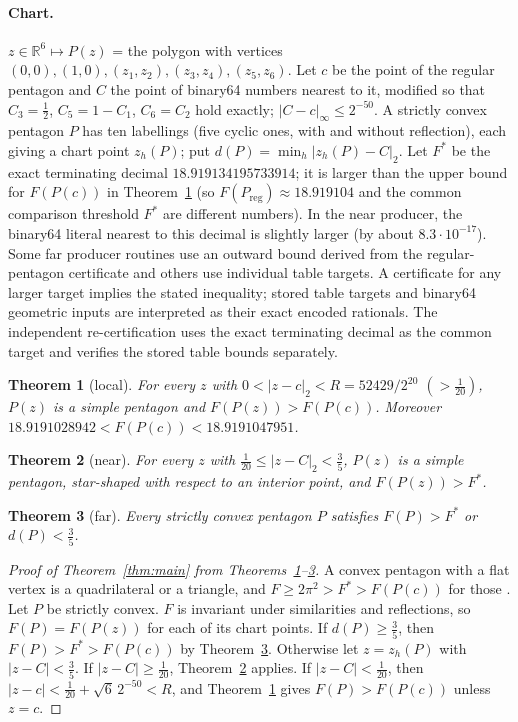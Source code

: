 \documentclass[11pt]{article}
\newtheorem{theorem}{Theorem}
\theoremstyle{remark}
\newcommand{\R}{\mathbb{R}}
\begin{document}
\paragraph{Chart.} $z\in\R^6\mapsto P(z)$ = the polygon with vertices $(0,0),(1,0),(z_1,z_2),(z_3,z_4),(z_5,z_6)$.
Let $c$ be the point of the regular pentagon and $C$ the point of binary64 numbers nearest to it, modified so that
$C_3=\frac12$, $C_5=1-C_1$, $C_6=C_2$ hold exactly; $|C-c|_\infty\le2^{-50}$. A strictly convex pentagon $P$ has ten
labellings (five cyclic ones, with and without reflection), each giving a chart point $z_h(P)$; put
$d(P)=\min_h|z_h(P)-C|_2$. Let $F^*$ be the exact terminating decimal $18.919134195733914$; it is larger than the upper
bound for $F(P(c))$ in Theorem~\ref{thm:L} (so $F(P_{\mathrm{reg}})\approx18.919104$ and the common comparison
threshold $F^*$ are different numbers). In the near producer, the binary64 literal nearest to this decimal is slightly
larger (by about $8.3\cdot10^{-17}$). Some far producer routines use an outward bound derived from the regular-pentagon
certificate and others use individual table targets. A certificate for any larger target implies the stated
inequality; stored table targets and binary64 geometric inputs are interpreted as their exact encoded rationals. The
independent re-certification uses the exact terminating decimal as the common target and verifies the stored table
bounds separately.

\begin{theorem}[local]\label{thm:L}
For every $z$ with $0<|z-c|_2<R=52429/2^{20}$ $(>\frac1{20})$, $P(z)$ is a simple pentagon and $F(P(z))>F(P(c))$. Moreover
$18.9191028942<F(P(c))<18.9191047951$.
\end{theorem}
\begin{theorem}[near]\label{thm:N}
For every $z$ with $\frac1{20}\le|z-C|_2<\frac35$, $P(z)$ is a simple pentagon, star-shaped with respect to an
interior point, and $F(P(z))>F^*$.
\end{theorem}
\begin{theorem}[far]\label{thm:F}
Every strictly convex pentagon $P$ satisfies $F(P)>F^*$ or $d(P)<\frac35$.
\end{theorem}
\begin{proof}[Proof of Theorem~\ref{thm:main} from Theorems~\ref{thm:L}--\ref{thm:F}]
A convex pentagon with a flat vertex is a quadrilateral or a triangle, and $F\ge2\pi^2>F^*>F(P(c))$ for those
\cite{ps}. Let $P$ be strictly convex. $F$ is invariant under similarities and reflections, so $F(P)=F(P(z))$ for each
of its chart points. If $d(P)\ge\frac35$, then $F(P)>F^*>F(P(c))$ by Theorem~\ref{thm:F}. Otherwise let
$z=z_h(P)$ with $|z-C|<\frac35$. If $|z-C|\ge\frac1{20}$, Theorem~\ref{thm:N} applies. If $|z-C|<\frac1{20}$, then
$|z-c|<\frac1{20}+\sqrt6\,2^{-50}<R$, and Theorem~\ref{thm:L} gives $F(P)>F(P(c))$ unless $z=c$.
\end{proof}
\end{document}
